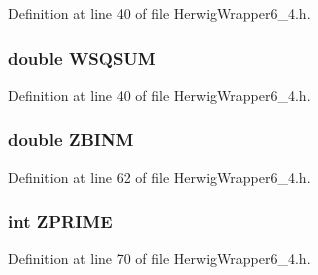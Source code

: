 Definition at line 40 of file Herwig\-Wrapper6\_\-4.h.
\subsubsection{\setlength{\rightskip}{0pt plus 5cm}double {\bf WSQSUM}}\label{HerwigWrapper6__4_8h_b2344a249b3f61668b7ef93ed0875b7d}




Definition at line 40 of file Herwig\-Wrapper6\_\-4.h.
\subsubsection{\setlength{\rightskip}{0pt plus 5cm}double {\bf ZBINM}}\label{HerwigWrapper6__4_8h_eceb557d98b4cb857ed1ff82886972fc}




Definition at line 62 of file Herwig\-Wrapper6\_\-4.h.
\subsubsection{\setlength{\rightskip}{0pt plus 5cm}int {\bf ZPRIME}}\label{HerwigWrapper6__4_8h_555c1cee2b7e18dd0f10cbd78b429626}




Definition at line 70 of file Herwig\-Wrapper6\_\-4.h.